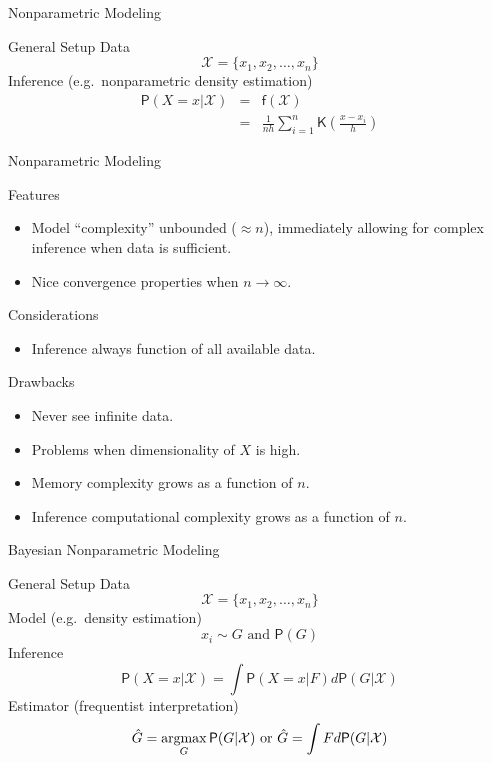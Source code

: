 \documentclass{beamer}
\begin{document}
\begin{frame}[t]{Nonparametric Modeling}
\begin{block}{General Setup}
Data 
\[\mathcal{X} = \{x_1, x_2, \ldots, x_n\}\]
Inference (e.g.~nonparametric density estimation)
\begin{eqnarray*}
\mathsf{P}(X = x | \mathcal{X}) &=& \mathsf{f}(\mathcal{X})\\
&=& \frac{1}{nh} \sum_{i=1}^n \mathsf{K}\left(\frac{x-x_i}{h}\right) 
\end{eqnarray*}
\end{block}
\end{frame}	

\begin{frame}[t]{Nonparametric Modeling}
\begin{exampleblock}{Features}
\begin{itemize}
\item Model ``complexity'' unbounded ($\approx n$), immediately allowing for complex inference when data is sufficient.
\item Nice convergence properties when $n \rightarrow \infty$.
\end{itemize}
\end{exampleblock}
\begin{block}{Considerations}
\begin{itemize}
\item Inference always function of all available data.
\end{itemize}
\end{block}
\begin{alertblock}{Drawbacks}
\begin{itemize}
\item Never see infinite data.
\item Problems when dimensionality of $X$ is high.
\item Memory complexity grows as a function of $n$.
\item Inference computational complexity grows as a function of $n$.
\end{itemize}
\end{alertblock}
\end{frame}	

\begin{frame}[t]{Bayesian Nonparametric Modeling}
\begin{block}{General Setup}
Data 
\[\mathcal{X} = \{x_1, x_2, \ldots, x_n\}\]
Model (e.g.~density estimation)
\[x_i \sim G  \mbox{ and } \mathsf{P}(G)\]
Inference
\[\mathsf{P}(X = x | \mathcal{X}) = \int \mathsf{P}(X=x|F)d\mathsf{P}(G | \mathcal{X})\]
Estimator (frequentist interpretation)
\[\hat G = \argmax_{G} \mathsf{P}(G | \mathcal{X}) \mbox{  or  }  \hat G = \int F d\mathsf{P}(G | \mathcal{X}) \]

\end{block}
\end{frame}	
\end{document}
